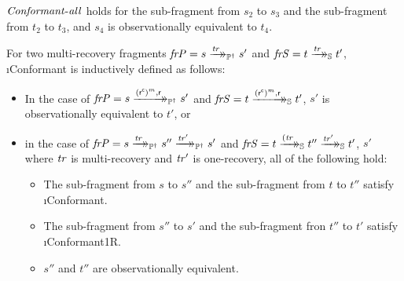 \begin{definition}
\begin{itemize}
        $\mathit{Conformant\text{-}all}$ holds for the sub-fragment from $s_2$ to $s_3$ and the sub-fragment from $t_2$ to $t_3$, and $s_4$ is observationally equivalent to $t_4$.
    \end{itemize}

\end{definition}

\begin{definition}[\i{Conformant}]
    For two multi-recovery fragments $\mathit{frP} = s \xrightarrow{\mathit{tr}}\mathrel{\mkern-14mu}\rightarrow_{\mathbb P^\dagger} s'$ and $\mathit{frS} = t \xrightarrow{\mathit{tr}}\mathrel{\mkern-14mu}\rightarrow_{\mathbb S} t'$, \i{Conformant} is inductively defined as follows:
    \begin{itemize}
        \item In the case of $\mathit{frP} = s \xrightarrow{(\mathsf{r^c})^m,\mathsf r}\mathrel{\mkern-14mu}\rightarrow_{\mathbb P^\dagger} s'$ and $\mathit{frS} = t \xrightarrow{(\mathsf{r^c})^m,\mathsf r}\mathrel{\mkern-14mu}\rightarrow_{\mathbb S} t'$, $s'$ is observationally equivalent to $t'$,
        or
        \item in the case of $\mathit{frP} = s \xrightarrow{\mathit{tr}}\mathrel{\mkern-14mu}\rightarrow_{\mathbb P^\dagger} s'' \xrightarrow{\mathit{tr'}}\mathrel{\mkern-14mu}\rightarrow_{\mathbb P^\dagger} s'$ and $\mathit{frS} = t \xrightarrow{(\mathit{tr}}\mathrel{\mkern-14mu}\rightarrow_{\mathbb S} t'' \xrightarrow{\mathit{tr'}}\mathrel{\mkern-14mu}\rightarrow_{\mathbb S} t'$, $s'$ where $\mathit{tr}$ is multi-recovery and $\mathit{tr'}$ is one-recovery, all of the following hold:
        \begin{itemize}
            \item The sub-fragment from $s$ to $s''$ and the sub-fragment from $t$ to $t''$ satisfy \i{Conformant}.
            \item The sub-fragment from $s''$ to $s'$ and the sub-fragment fron $t''$ to $t'$ satisfy \i{Conformant\text{-}1R}.
            \item $s''$ and $t''$ are observationally equivalent.
        \end{itemize} 
    \end{itemize}
\end{definition}


